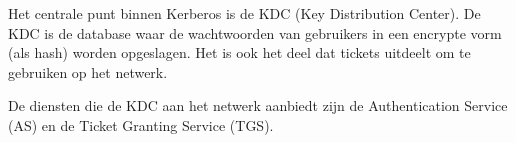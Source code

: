 Het centrale punt binnen Kerberos is de KDC (Key Distribution Center). De KDC is de database waar de wachtwoorden van gebruikers in een encrypte vorm (als hash) worden opgeslagen. Het is ook het deel dat tickets uitdeelt om te gebruiken op het netwerk.

De diensten die de KDC aan het netwerk aanbiedt zijn de Authentication Service (AS) en de Ticket Granting Service (TGS).

